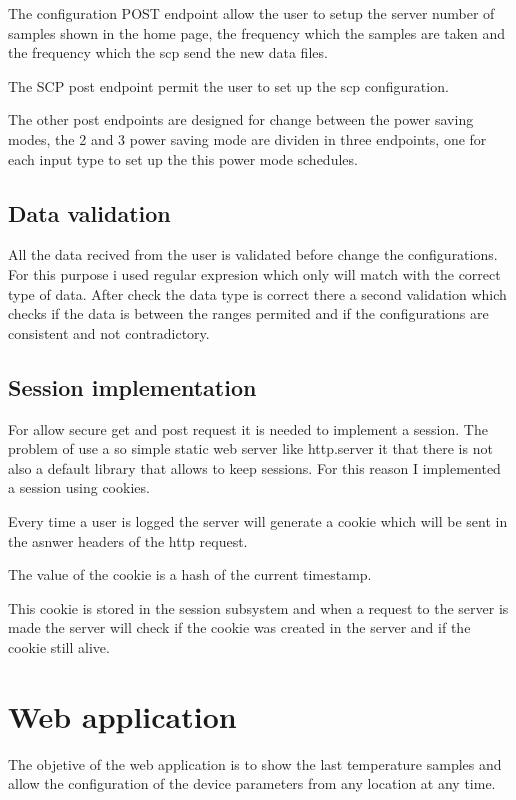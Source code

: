 		The configuration POST endpoint allow the user to setup the server number of samples shown in the home page, the frequency which the samples are taken and the frequency which the scp send the new data files.

		The SCP post endpoint permit the user to set up the scp configuration.

		The other post endpoints are designed for change between the power saving modes, the 2 and 3 power saving mode are dividen in three endpoints, one for each input type to set up the this power mode schedules.

		\subsection{Data validation}
		All the data recived from the user is validated before change the configurations. For this purpose i used regular expresion which only will match with the correct type of data. After check the data type is correct there a second validation which checks if the data is between the ranges permited and if the configurations are consistent and not contradictory.

		\subsection{Session implementation}
		For allow secure get and post request it is needed to implement a session. The problem of use a so simple static web server like http.server it that there is not also a default library that allows to keep sessions.
		For this reason I implemented a session using cookies.

		Every time a user is logged the server will generate a cookie which will be sent in the asnwer headers of the http request.

		The value of the cookie is a hash of the current timestamp.

		This cookie is stored in the session subsystem and when a request to the server is made the server will check if the cookie was created in the server and if the cookie still alive.

	\section{Web application}
	The objetive of the web application is to show the last temperature samples and allow the configuration of the device parameters from any location at any time.

